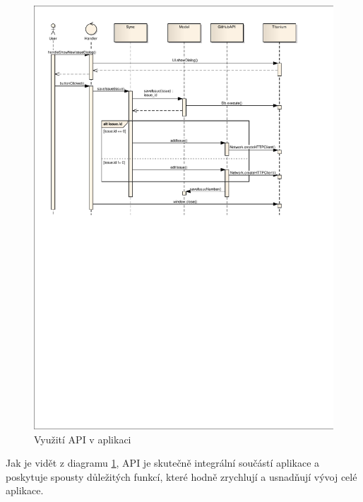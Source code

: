 \begin{figure}[h]
\begin{center}
	\includegraphics[width=15cm,scale=2,trim=10mm 145mm 10mm 10mm, clip]{figures/vyuziti-api}
	\caption{Využití API v aplikaci}
	\label{fig:vyuziti-api}
\end{center}
\end{figure}

Jak je vidět z diagramu \ref{fig:vyuziti-api}, API je skutečně integrální součástí aplikace a poskytuje spousty důležitých funkcí, které hodně zrychlují a usnadňují vývoj celé aplikace.